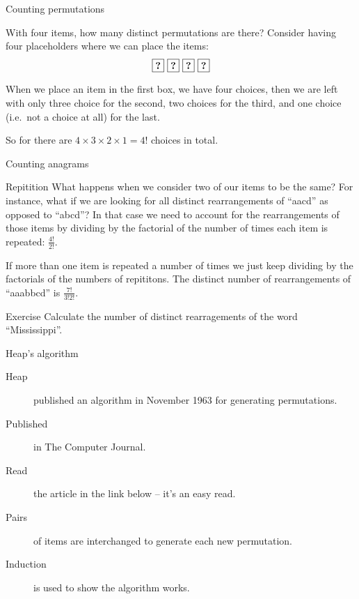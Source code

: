 \begin{frame}[fragile]{Counting permutations}
  \begin{block}{With four items, how many distinct permutations are there?}
    Consider having four placeholders where we can place the items:
    \[ \textbf{\fbox{?}} \  \textbf{\fbox{?}} \  \textbf{\fbox{?}} \  \textbf{\fbox{?}} \]
    
    When we place an item in the first box, we have four choices, then we are left with only three choice for the second, two choices for the third, and one choice (i.e.\ not a choice at all) for the last.

  So for there are $4 \times 3 \times 2 \times 1 = 4!$ choices in total.
  \end{block}


\end{frame}

\begin{frame}[fragile]{Counting anagrams}
  \begin{block}{Repitition}
    What happens when we consider two of our items to be the same?
    For instance, what if we are looking for all distinct rearrangements of ``aacd'' as opposed to ``abcd''?
  In that case we need to account for the rearrangements of those items by dividing by the factorial of the number of times each item is repeated: $\frac{4!}{2!}$.
  \end{block}
  
  If more than one item is repeated a number of times we just keep dividing by the factorials of the numbers of repititons.
  The distinct number of rearrangements of ``aaabbcd'' is $\frac{7!}{3!2!}$.

  \begin{block}{Exercise}
    Calculate the number of distinct rearragements of the word ``Mississippi''.
  \end{block}
\end{frame}


\begin{frame}[fragile]{Heap's algorithm}
  \begin{description}
    \item[Heap] published an algorithm in November 1963 for generating permutations.
    \item[Published] in The Computer Journal.
    \item[Read] the article in the link below -- it's an easy read.
    \item[Pairs] of items are interchanged to generate each new permutation.
    \item[Induction] is used to show the algorithm works.
  \end{description}
\end{frame}

